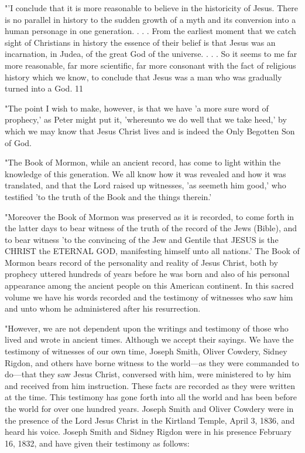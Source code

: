 "'I conclude that it is more reasonable to believe in the historicity of Jesus. There is no
parallel in history to the sudden growth of a myth and its conversion into a human personage
in one generation. . . . From the earliest moment that we catch sight of Christians in history
the essence of their belief is that Jesus was an incarnation, in Judea, of the great God of the
universe. . . . So it seems to me far more reasonable, far more scientific, far more consonant
with the fact of religious history which we know, to conclude that Jesus was a man who was
gradually turned into a God. 11

"The point I wish to make, however, is that we have 'a more sure word of prophecy,' as Peter
might put it, 'whereunto we do well that we take heed,' by which we may know that Jesus
Christ lives and is indeed the Only Begotten Son of God.

"The Book of Mormon, while an ancient record, has come to light within the knowledge of
this generation. We all know how it was revealed and how it was translated, and that the
Lord raised up witnesses, 'as seemeth him good,' who testified 'to the truth of the Book and
the things therein.'

"Moreover the Book of Mormon was preserved as it is recorded, to come forth in the latter
days to bear witness of the truth of the record of the Jews (Bible), and to bear witness 'to the
convincing of the Jew and Gentile that JESUS is the CHRIST the ETERNAL GOD,
manifesting himself unto all nations.' The Book of Mormon bears record of the personality
and reality of Jesus Christ, both by prophecy uttered hundreds of years before he was born
and also of his personal appearance among the ancient people on this American continent. In
this sacred volume we have his words recorded and the testimony of witnesses who saw him
and unto whom he administered after his resurrection.

"However, we are not dependent upon the writings and testimony of those who lived and
wrote in ancient times. Although we accept their sayings. We have the testimony of
witnesses of our own time, Joseph Smith, Oliver Cowdery, Sidney Rigdon, and others have
borne witness to the world—as they were commanded to do—that they saw Jesus Christ,
conversed with him, were ministered to by him and received from him instruction. These
facts are recorded as they were written at the time. This testimony has gone forth into all the
world and has been before the world for over one hundred years. Joseph Smith and Oliver
Cowdery were in the presence of the Lord Jesus Christ in the Kirtland Temple, April 3, 1836,
and heard his voice. Joseph Smith and Sidney Rigdon were in his presence February 16,
1832, and have given their testimony as follows:

